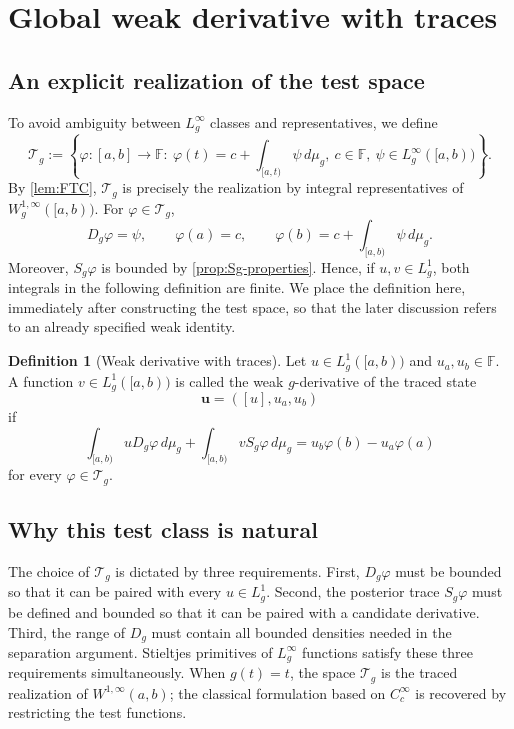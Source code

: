 \documentclass[preprint,12pt]{elsarticle}
\newenvironment{revision}{\begingroup\color{red}}{\endgroup}
\newenvironment{revision}{}{}
\theoremstyle{definition}
\newtheorem{definition}[theorem]{Definition}
\theoremstyle{remark}
\newcommand{\F}{\mathbb F}
\newcommand{\mug}{\mu_g}
\begin{document}
\section{Global weak derivative with traces}\label{sec:weak}

\subsection{An explicit realization of the test space}

To avoid ambiguity between $L_g^\infty$ classes and representatives, we define
\begin{equation}\label{eq:test-space}
 \mathcal T_g:=\left\{\varphi:[a,b]\to\F:\ 
 \varphi(t)=c+\int_{[a,t)}\psi\,d\mug,
 \ c\in\F,\ \psi\in L_g^\infty([a,b))\right\}.
\end{equation}
By \cref{lem:FTC}, $\mathcal T_g$ is precisely the realization by integral representatives of $W_g^{1,\infty}([a,b))$. For $\varphi\in\mathcal T_g$,
\[
 D_g\varphi=\psi,
 \qquad
 \varphi(a)=c,
 \qquad
 \varphi(b)=c+\int_{[a,b)}\psi\,d\mug.
\]
\begin{revision}
Moreover, \(S_g\varphi\) is bounded by
\cref{prop:Sg-properties}. Hence, if \(u,v\in L_g^1\), both integrals in
the following definition are finite.  We place the definition here, immediately
after constructing the test space, so that the later discussion refers to an
already specified weak identity.

\begin{definition}[Weak derivative with traces]\label{def:weak-derivative}
Let \(u\in L_g^1([a,b))\) and \(u_a,u_b\in\F\). A function
\(v\in L_g^1([a,b))\) is called the weak \(g\)-derivative of the traced state
\[
 \mathbf u=([u],u_a,u_b)
\]
if
\begin{equation}\label{eq:weak-global}
 \int_{[a,b)}uD_g\varphi\,d\mug
 +\int_{[a,b)}vS_g\varphi\,d\mug
 =u_b\varphi(b)-u_a\varphi(a)
\end{equation}
for every \(\varphi\in\mathcal T_g\).
\end{definition}
\end{revision}

\subsection{Why this test class is natural}

The choice of $\mathcal T_g$ is dictated by three requirements. First, $D_g\varphi$ must be bounded so that it can be paired with every $u\in L_g^1$. Second, the posterior trace $S_g\varphi$ must be defined and bounded so that it can be paired with a candidate derivative. Third, the range of $D_g$ must contain all bounded densities needed in the separation argument. Stieltjes primitives of $L_g^\infty$ functions satisfy these three requirements simultaneously. When $g(t)=t$, the space $\mathcal T_g$ is the traced realization of $W^{1,\infty}(a,b)$; the classical formulation based on $C_c^\infty$ is recovered by restricting the test functions.
\end{document}
